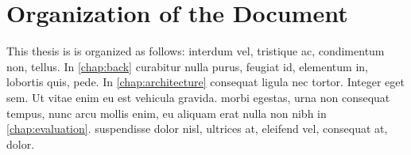 \section{Organization of the Document}
This thesis is is organized as follows:  interdum vel, tristique ac, condimentum non, tellus. 
In \cref{chap:back} curabitur nulla purus, feugiat id, elementum in, lobortis quis, pede.
In \cref{chap:architecture} consequat ligula nec tortor. Integer eget sem. Ut vitae enim eu est vehicula gravida.
 morbi egestas, urna non consequat tempus, nunc arcu mollis enim, eu aliquam erat nulla non nibh in \cref{chap:evaluation}.
 suspendisse dolor nisl, ultrices at, eleifend vel, consequat at, dolor.
